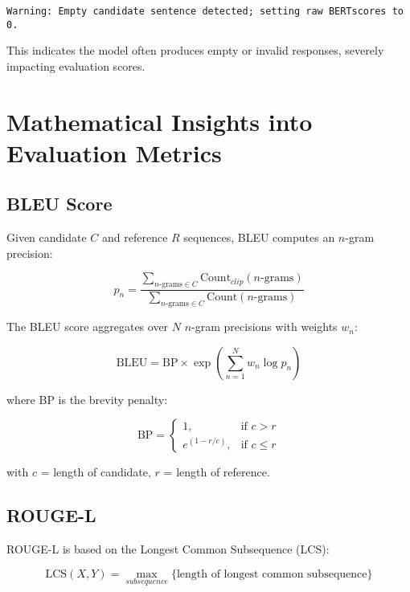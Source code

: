 \documentclass[12pt]{article}
\begin{document}
\begin{verbatim}
Warning: Empty candidate sentence detected; setting raw BERTscores to 0.
\end{verbatim}
This indicates the model often produces empty or invalid responses, severely impacting evaluation scores.

\section{Mathematical Insights into Evaluation Metrics}
\subsection{BLEU Score}
Given candidate \( C \) and reference \( R \) sequences, BLEU computes an \( n \)-gram precision:

\begin{equation}
p_n = \frac{\sum_{n\text{-grams} \in C} \text{Count}_{clip}(n\text{-grams})}{\sum_{n\text{-grams} \in C} \text{Count}(n\text{-grams})}
\end{equation}

The BLEU score aggregates over \( N \) \( n \)-gram precisions with weights \( w_n \):

\begin{equation}
\text{BLEU} = \text{BP} \times \exp \left( \sum_{n=1}^N w_n \log p_n \right)
\end{equation}

where \( \text{BP} \) is the brevity penalty:

\begin{equation}
\text{BP} = \begin{cases}
1, & \text{if } c > r \\
e^{(1 - r/c)}, & \text{if } c \leq r
\end{cases}
\end{equation}

with \( c \) = length of candidate, \( r \) = length of reference.

\subsection{ROUGE-L}
ROUGE-L is based on the Longest Common Subsequence (LCS):

\begin{equation}
\text{LCS}(X, Y) = \max_{subsequence} \{ \text{length of longest common subsequence} \}
\end{equation}
\end{document}
